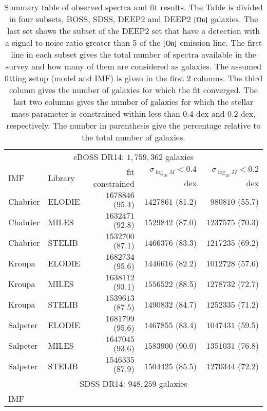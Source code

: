 \documentclass[onecolumn]{aa}
\newcommand{\OII}{$\left[\mathrm{O\textrm{\textsc{ii}}}\right]$\xspace}
\begin{document}
\begin{table*}
\caption{\label{table:single:spectra} Summary table of observed spectra and fit results. 
The Table is divided in four subsets, BOSS, SDSS, DEEP2 and DEEP2 \OII galaxies.
The last set shows the subset of the DEEP2 set that have a detection with a signal to noise ratio greater than 5 of the \OII emission line. 
The first line in each subset gives the total number of spectra available in the survey and how many of them are considered as galaxies. 
The assumed fitting setup (model and IMF)  is given in the first 2 columns. 
The third column gives the number of galaxies for which the fit converged. 
The last two columns gives the number of galaxies for which the stellar mass parameter is constrained within less than 0.4 dex and 0.2 dex, respectively. 
The number in parenthesis give the percentage relative to the total number of galaxies.}
\begin{center}
\begin{tabular}{ll rrr}
\hline \hline
\multicolumn{5}{c}{eBOSS DR14: $1,759,362$ galaxies} \\
IMF &
Library & 
fit constrained & 
$\sigma_{\log_{10}M}<0.4$ dex & 
$\sigma_{\log_{10}M}<0.2$ dex \\ \hline
Chabrier & ELODIE & $1678846$ (95.4) & $1427861$ (81.2) & $980810$ (55.7) \\ 
Chabrier & MILES & $1632471$ (92.8) & $1529842$ (87.0) & $1237575$ (70.3) \\ 
Chabrier & STELIB & $1532700$ (87.1) & $1466376$ (83.3) & $1217235$ (69.2) \\ 
Kroupa & ELODIE & $1682734$ (95.6) & $1446616$ (82.2) & $1012728$ (57.6) \\ 
Kroupa & MILES & $1638112$ (93.1) & $1556522$ (88.5) & $1278732$ (72.7) \\ 
Kroupa & STELIB & $1539613$ (87.5) & $1490832$ (84.7) & $1252335$ (71.2) \\ 
Salpeter & ELODIE & $1681799$ (95.6) & $1467855$ (83.4) & $1047431$ (59.5) \\ 
Salpeter & MILES & $1647045$ (93.6) & $1583900$ (90.0) & $1351031$ (76.8) \\ 
Salpeter & STELIB & $1546335$ (87.9) & $1504425$ (85.5) & $1270344$ (72.2) \\ 
\hline 
 \multicolumn{5}{c}{SDSS DR14: $948,259$ galaxies} \\
IMF &

\end{tabular}
\end{center}
\end{table*}
\end{document}
